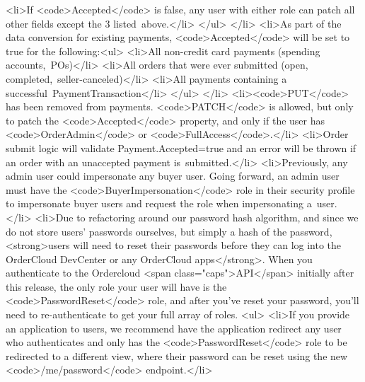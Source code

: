\documentclass{memoir}%
\begin{document}
<li>If <code>Accepted</code> is false, any user with either role can patch all other fields except the 3 listed~above.</li>\newline%
</ul>\newline%
</li>\newline%
<li>As part of the data conversion for existing payments, <code>Accepted</code> will be set to true for the following:<ul>\newline%
<li>All non{-}credit card payments (spending accounts,~POs)</li>\newline%
<li>All orders that were ever submitted (open, completed,~seller{-}canceled)</li>\newline%
<li>All payments containing a successful~PaymentTransaction</li>\newline%
</ul>\newline%
</li>\newline%
<li><code>PUT</code> has been removed from payments. <code>PATCH</code> is allowed, but only to patch the <code>Accepted</code> property, and only if the user has <code>OrderAdmin</code> or <code>FullAccess</code>.</li>\newline%
<li>Order submit logic will validate Payment.Accepted=true and an error will be thrown if an order with an unaccepted payment is~submitted.</li>\newline%
<li>Previously, any admin user could impersonate any buyer user. Going forward, an admin user must have the <code>BuyerImpersonation</code> role in their security profile to impersonate buyer users and request the role when impersonating a~user.</li>\newline%
<li>Due to refactoring around our password hash algorithm, and since we do not store users’ passwords ourselves, but simply a hash of the password, <strong>users will need to reset their passwords before they can log into the OrderCloud DevCenter or any OrderCloud apps</strong>. When you authenticate to the Ordercloud <span class="caps">API</span> initially after this release, the only role your user will have is the <code>PasswordReset</code> role, and after you’ve reset your password, you’ll need to re{-}authenticate to get your full array of roles. <ul>\newline%
<li>If you provide an application to users, we recommend have the application redirect any user who authenticates and only has the <code>PasswordReset</code> role to be redirected to a different view, where their password can be reset using the new <code>/me/password</code> endpoint.</li>\newline%
\end{document}
